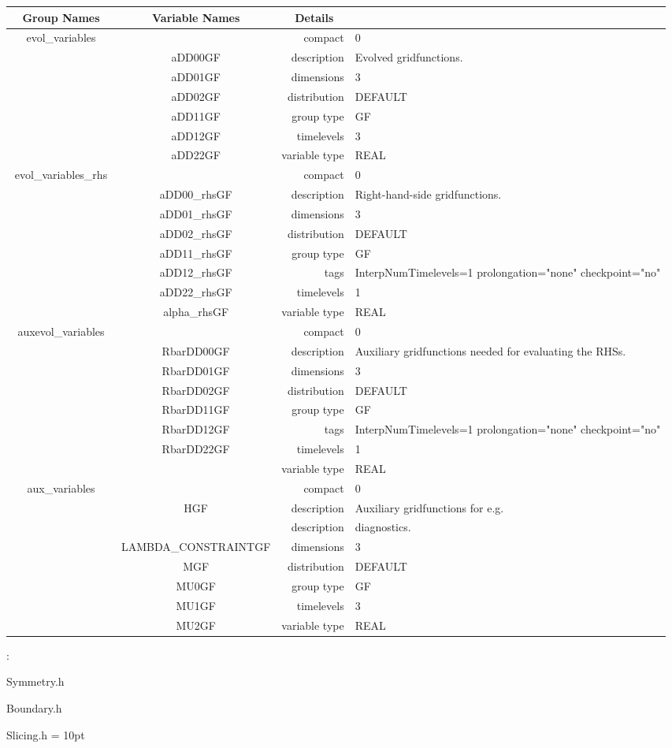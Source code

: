 \begin{tabular*}{150mm}{|c|c@{\extracolsep{\fill}}|rl|} \hline 
~ {\bf Group Names} ~ & ~ {\bf Variable Names} ~  &{\bf Details} ~ & ~\\ 
\hline 
evol\_variables &  & compact & 0 \\ 
 & aDD00GF & description & Evolved gridfunctions. \\ 
 & aDD01GF & dimensions & 3 \\ 
 & aDD02GF & distribution & DEFAULT \\ 
 & aDD11GF & group type & GF \\ 
 & aDD12GF & timelevels & 3 \\ 
 & aDD22GF & variable type & REAL \\ 
\hline 
evol\_variables\_rhs &  & compact & 0 \\ 
 & aDD00\_rhsGF & description & Right-hand-side gridfunctions. \\ 
 & aDD01\_rhsGF & dimensions & 3 \\ 
 & aDD02\_rhsGF & distribution & DEFAULT \\ 
 & aDD11\_rhsGF & group type & GF \\ 
 & aDD12\_rhsGF & tags & InterpNumTimelevels=1 prolongation="none" checkpoint="no" \\ 
 & aDD22\_rhsGF & timelevels & 1 \\ 
 & alpha\_rhsGF & variable type & REAL \\ 
\hline 
auxevol\_variables &  & compact & 0 \\ 
 & RbarDD00GF & description & Auxiliary gridfunctions needed for evaluating the RHSs. \\ 
 & RbarDD01GF & dimensions & 3 \\ 
 & RbarDD02GF & distribution & DEFAULT \\ 
 & RbarDD11GF & group type & GF \\ 
 & RbarDD12GF & tags & InterpNumTimelevels=1 prolongation="none" checkpoint="no" \\ 
 & RbarDD22GF & timelevels & 1 \\ 
 &  & variable type & REAL \\ 
\hline 
aux\_variables &  & compact & 0 \\ 
 & HGF & description & Auxiliary gridfunctions for e.g. \\ 
& ~ & description &  diagnostics. \\ 
 & LAMBDA\_CONSTRAINTGF & dimensions & 3 \\ 
 & MGF & distribution & DEFAULT \\ 
 & MU0GF & group type & GF \\ 
 & MU1GF & timelevels & 3 \\ 
 & MU2GF & variable type & REAL \\ 
\hline 
\end{tabular*} 



\vspace{5mm}

: 

Symmetry.h

Boundary.h

Slicing.h
\vspace{2mm}\parskip = 10pt 
